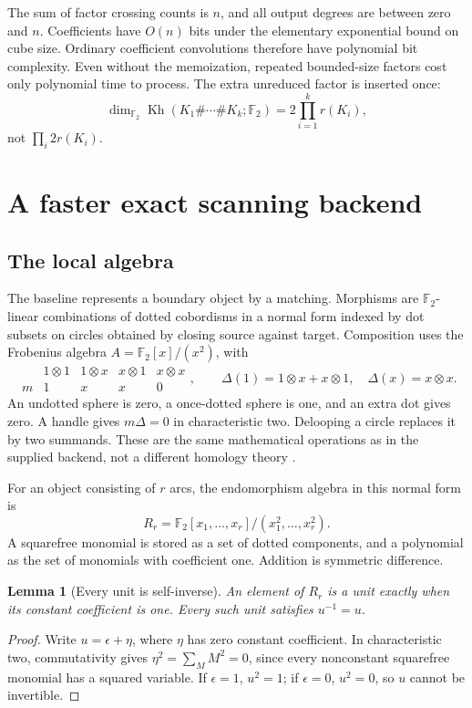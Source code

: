 \documentclass[11pt,a4paper]{article}
\newtheorem{lemma}[theorem]{Lemma}
\theoremstyle{definition}\newtheorem{remark}[theorem]{Remark}
\newcommand{\F}{\mathbb F_2}
\newcommand{\Kh}{\operatorname{Kh}}
\begin{document}
The sum of factor crossing counts is $n$, and all output degrees are between
zero and $n$. Coefficients have $O(n)$ bits under the elementary exponential
bound on cube size. Ordinary coefficient convolutions therefore have polynomial
bit complexity. Even without the memoization, repeated bounded-size factors cost
only polynomial time to process. The extra unreduced factor is inserted once:
\[
\dim_{\F}\Kh(K_1\#\cdots\#K_k;\F)=2\prod_{i=1}^k r(K_i),
\]
not $\prod_i 2r(K_i)$.

\section{A faster exact scanning backend}
\label{sec:scan}
\subsection{The local algebra}
The baseline represents a boundary object by a matching. Morphisms are
$\F$-linear combinations of dotted cobordisms in a normal form indexed by dot
subsets on circles obtained by closing source against target. Composition uses
the Frobenius algebra $A=\F[x]/(x^2)$, with
\[
\begin{array}{c|cccc}
&1\otimes1&1\otimes x&x\otimes1&x\otimes x\\\hline
m&1&x&x&0
\end{array},\qquad
\Delta(1)=1\otimes x+x\otimes1,\quad\Delta(x)=x\otimes x.
\]
An undotted sphere is zero, a once-dotted sphere is one, and an extra dot gives
zero. A handle gives $m\Delta=0$ in characteristic two. Delooping a circle
replaces it by two summands. These are the same mathematical operations as in
the supplied backend, not a different homology theory \cite{BNtangles,BNfast}.

For an object consisting of $r$ arcs, the endomorphism algebra in this normal
form is
\begin{equation}
R_r=\F[x_1,\ldots,x_r]/(x_1^2,\ldots,x_r^2).
\label{eq:localring}
\end{equation}
A squarefree monomial is stored as a set of dotted components, and a polynomial
as the set of monomials with coefficient one. Addition is symmetric difference.

\begin{lemma}[Every unit is self-inverse]
An element of $R_r$ is a unit exactly when its constant coefficient is one.
Every such unit satisfies $u^{-1}=u$.
\end{lemma}
\begin{proof}
Write $u=\epsilon+\eta$, where $\eta$ has zero constant coefficient. In
characteristic two, commutativity gives $\eta^2=\sum_M M^2=0$, since every
nonconstant squarefree monomial has a squared variable. If $\epsilon=1$,
$u^2=1$; if $\epsilon=0$, $u^2=0$, so $u$ cannot be invertible.
\end{proof}
\end{document}
